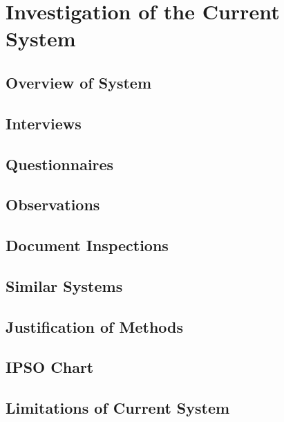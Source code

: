 \section{Investigation of the Current System}

\subsection{Overview of System}

\subsection{Interviews}

\subsection{Questionnaires}

\subsection{Observations}

\subsection{Document Inspections}

\subsection{Similar Systems}

\subsection{Justification of Methods}

\subsection{IPSO Chart}

\subsection{Limitations of Current System}